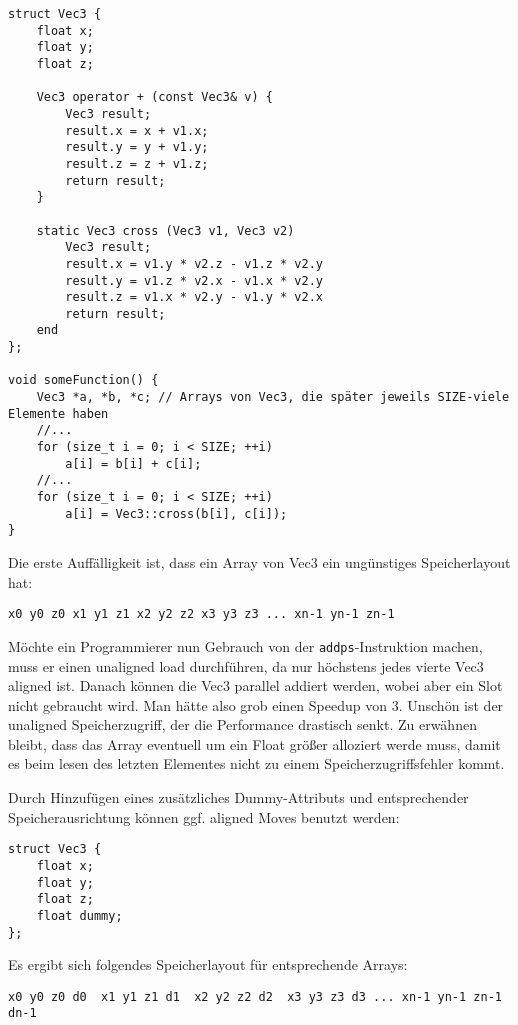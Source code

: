 \documentclass[a4paper,10pt]{article}
\begin{document}
\begin{verbatim}
struct Vec3 {
    float x;
    float y;
    float z;

    Vec3 operator + (const Vec3& v) {
        Vec3 result;
        result.x = x + v1.x;
        result.y = y + v1.y;
        result.z = z + v1.z;
        return result;
    }

    static Vec3 cross (Vec3 v1, Vec3 v2)
        Vec3 result;
        result.x = v1.y * v2.z - v1.z * v2.y
        result.y = v1.z * v2.x - v1.x * v2.y
        result.z = v1.x * v2.y - v1.y * v2.x
        return result;
    end
};

void someFunction() {
    Vec3 *a, *b, *c; // Arrays von Vec3, die später jeweils SIZE-viele Elemente haben
    //...
    for (size_t i = 0; i < SIZE; ++i)
        a[i] = b[i] + c[i];
    //...
    for (size_t i = 0; i < SIZE; ++i)
        a[i] = Vec3::cross(b[i], c[i]);
}
\end{verbatim}

Die erste Auffälligkeit ist, dass ein Array von Vec3 ein ungünstiges Speicherlayout hat:

\begin{verbatim}
x0 y0 z0 x1 y1 z1 x2 y2 z2 x3 y3 z3 ... xn-1 yn-1 zn-1
\end{verbatim}

Möchte ein Programmierer nun Gebrauch von der \texttt{addps}-Instruktion machen, muss er einen
unaligned load durchführen, da nur höchstens jedes vierte Vec3 aligned ist. Danach können die Vec3
parallel addiert werden, wobei aber ein Slot nicht gebraucht wird. Man hätte also grob einen Speedup
von 3. Unschön ist der unaligned Speicherzugriff, der die Performance drastisch senkt. Zu erwähnen
bleibt, dass das Array eventuell um ein Float größer alloziert werde muss, damit es beim lesen des
letzten Elementes nicht zu einem Speicherzugriffsfehler kommt.

Durch Hinzufügen eines zusätzliches Dummy-Attributs und entsprechender Speicherausrichtung können
ggf. aligned Moves benutzt werden:

\begin{verbatim}
struct Vec3 {
    float x;
    float y;
    float z;
    float dummy;
};
\end{verbatim}

Es ergibt sich folgendes Speicherlayout für entsprechende Arrays:

\begin{verbatim}
x0 y0 z0 d0  x1 y1 z1 d1  x2 y2 z2 d2  x3 y3 z3 d3 ... xn-1 yn-1 zn-1 dn-1
\end{verbatim}
\end{document}
